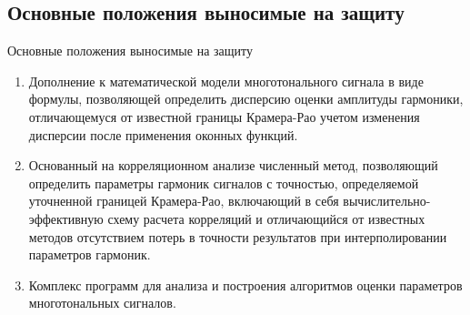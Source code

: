 \subsection{Основные положения выносимые на защиту}
\begin{frame}{Основные положения выносимые на защиту}
	\begin{enumerate}
		\item Дополнение к математической модели многотонального сигнала в виде формулы, позволяющей определить дисперсию оценки амплитуды гармоники, отличающемуся от известной границы Крамера-Рао учетом изменения дисперсии после применения оконных функций.
		\item Основанный на корреляционном анализе численный метод, позволяющий определить параметры гармоник сигналов с точностью, определяемой уточненной границей Крамера-Рао, включающий в себя вычислительно-эффективную схему расчета корреляций и отличающийся от известных методов отсутствием потерь в точности результатов при интерполировании параметров гармоник.
		\item Комплекс программ для анализа и построения алгоритмов оценки параметров многотональных сигналов.
	\end{enumerate}
\end{frame}

